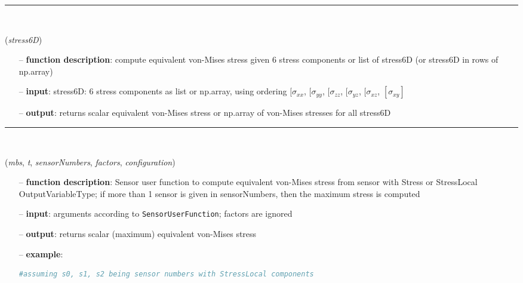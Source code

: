 \begin{itemize}[leftmargin=1.4cm]
\begin{itemize}[leftmargin=0.5cm]
\begin{itemize}[leftmargin=1.4cm]
\begin{itemize}[leftmargin=0.5cm]
\begin{itemize}[leftmargin=1.4cm]
\begin{itemize}[leftmargin=0.5cm]
\begin{itemize}[leftmargin=1.4cm]
\begin{itemize}[leftmargin=1.4cm]
\begin{itemize}[leftmargin=1.4cm]
\begin{itemize}[leftmargin=1.4cm]
\begin{itemize}[leftmargin=0.5cm]
\begin{itemize}[leftmargin=1.4cm]
%
\noindent\rule{8cm}{0.75pt}\vspace{1pt} \\ 
\begin{flushleft}
\label{sec:physics:VonMisesStress}
({\it stress6D})
\end{flushleft}
\setlength{\itemindent}{0.7cm}
\begin{itemize}[leftmargin=0.7cm]
  \item[--]  {\bf function description}: compute equivalent von-Mises stress given 6 stress components or list of stress6D (or stress6D in rows of np.array)  \item[--]  {\bf input}: stress6D: 6 stress components as list or np.array, using ordering $[\sigma_{xx}$, $[\sigma_{yy}$, $[\sigma_{zz}$, $[\sigma_{yz}$, $[\sigma_{xz}$, $[\sigma_{xy}]$  \item[--]  {\bf output}: returns scalar equivalent von-Mises stress or np.array of von-Mises stresses for all stress6D\vspace{12pt}\end{itemize}
%
\noindent\rule{8cm}{0.75pt}\vspace{1pt} \\ 
\begin{flushleft}
\label{sec:physics:UFvonMisesStress}
({\it mbs}, {\it t}, {\it sensorNumbers}, {\it factors}, {\it configuration})
\end{flushleft}
\setlength{\itemindent}{0.7cm}
\begin{itemize}[leftmargin=0.7cm]
  \item[--]  {\bf function description}: Sensor user function to compute equivalent von-Mises stress from sensor with Stress or StressLocal OutputVariableType; if more than 1 sensor is given in sensorNumbers, then the maximum stress is computed  \item[--]  {\bf input}: arguments according to \texttt{SensorUserFunction}; factors are ignored  \item[--]  {\bf output}: returns scalar (maximum) equivalent von-Mises stress  \item[--]  {\bf example}: \vspace{-12pt}\ei\begin{lstlisting}[language=Python, xleftmargin=36pt]
#assuming s0, s1, s2 being sensor numbers with StressLocal components

\end{lstlisting}
\end{itemize}
\end{itemize}
\end{itemize}
\end{itemize}
\end{itemize}
\end{itemize}
\end{itemize}
\end{itemize}
\end{itemize}
\end{itemize}
\end{itemize}
\end{itemize}
\end{itemize}

